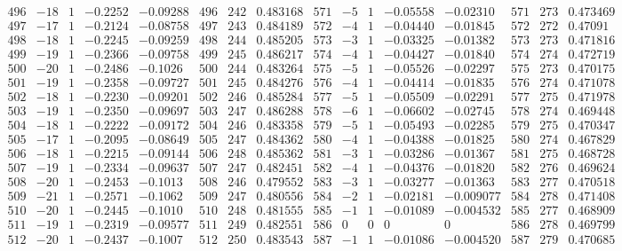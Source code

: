 \documentclass[11pt,reqno,a4letter]{article}
\numberwithin{figure}{section}
\numberwithin{table}{section}
\theoremstyle{plain}
\numberwithin{theorem}{section}
\theoremstyle{definition}
\begin{document}
\begin{table}[ht]
\begin{equation*}
{\begin{array}{ccccc|ccc|ccccc|ccc}
 496 & -18 & 1 & -0.2252 & -0.09288 & 496 & 242 & 0.483168 & 571 & -5 & 1 & -0.05558 & -0.02310 & 571 & 273 & 0.473469 \\
 497 & -17 & 1 & -0.2124 & -0.08758 & 497 & 243 & 0.484189 & 572 & -4 & 1 & -0.04440 & -0.01845 & 572 & 272 & 0.47091 \\
 498 & -18 & 1 & -0.2245 & -0.09259 & 498 & 244 & 0.485205 & 573 & -3 & 1 & -0.03325 & -0.01382 & 573 & 273 & 0.471816 \\
 499 & -19 & 1 & -0.2366 & -0.09758 & 499 & 245 & 0.486217 & 574 & -4 & 1 & -0.04427 & -0.01840 & 574 & 274 & 0.472719 \\
 500 & -20 & 1 & -0.2486 & -0.1026 & 500 & 244 & 0.483264 & 575 & -5 & 1 & -0.05526 & -0.02297 & 575 & 273 & 0.470175 \\
 501 & -19 & 1 & -0.2358 & -0.09727 & 501 & 245 & 0.484276 & 576 & -4 & 1 & -0.04414 & -0.01835 & 576 & 274 & 0.471078 \\
 502 & -18 & 1 & -0.2230 & -0.09201 & 502 & 246 & 0.485284 & 577 & -5 & 1 & -0.05509 & -0.02291 & 577 & 275 & 0.471978 \\
 503 & -19 & 1 & -0.2350 & -0.09697 & 503 & 247 & 0.486288 & 578 & -6 & 1 & -0.06602 & -0.02745 & 578 & 274 & 0.469448 \\
 504 & -18 & 1 & -0.2222 & -0.09172 & 504 & 246 & 0.483358 & 579 & -5 & 1 & -0.05493 & -0.02285 & 579 & 275 & 0.470347 \\
 505 & -17 & 1 & -0.2095 & -0.08649 & 505 & 247 & 0.484362 & 580 & -4 & 1 & -0.04388 & -0.01825 & 580 & 274 & 0.467829 \\
 506 & -18 & 1 & -0.2215 & -0.09144 & 506 & 248 & 0.485362 & 581 & -3 & 1 & -0.03286 & -0.01367 & 581 & 275 & 0.468728 \\
 507 & -19 & 1 & -0.2334 & -0.09637 & 507 & 247 & 0.482451 & 582 & -4 & 1 & -0.04376 & -0.01820 & 582 & 276 & 0.469624 \\
 508 & -20 & 1 & -0.2453 & -0.1013 & 508 & 246 & 0.479552 & 583 & -3 & 1 & -0.03277 & -0.01363 & 583 & 277 & 0.470518 \\
 509 & -21 & 1 & -0.2571 & -0.1062 & 509 & 247 & 0.480556 & 584 & -2 & 1 & -0.02181 & -0.009077 & 584 & 278 & 0.471408 \\
 510 & -20 & 1 & -0.2445 & -0.1010 & 510 & 248 & 0.481555 & 585 & -1 & 1 & -0.01089 & -0.004532 & 585 & 277 & 0.468909 \\
 511 & -19 & 1 & -0.2319 & -0.09577 & 511 & 249 & 0.482551 & 586 & 0 & 0 & 0 & 0 & 586 & 278 & 0.469799 \\
 512 & -20 & 1 & -0.2437 & -0.1007 & 512 & 250 & 0.483543 & 587 & -1 & 1 & -0.01086 & -0.004520 & 587 & 279 & 0.470685 \\

\end{array}}
\end{equation*}
\end{table}
\end{document}
